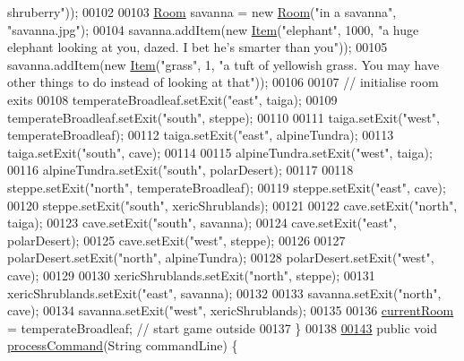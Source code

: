 \begin{DoxyCode}
{       shruberry"}));
00102 
00103         \hyperlink{classRoom}{Room} savanna = \textcolor{keyword}{new} \hyperlink{classRoom}{Room}(\textcolor{stringliteral}{"in a savanna"}, \textcolor{stringliteral}{"savanna.jpg"});
00104         savanna.addItem(\textcolor{keyword}{new} \hyperlink{classItem}{Item}(\textcolor{stringliteral}{"elephant"}, 1000, \textcolor{stringliteral}{"a huge elephant looking at you, dazed. I bet he's
       smarter than you"}));
00105         savanna.addItem(\textcolor{keyword}{new} \hyperlink{classItem}{Item}(\textcolor{stringliteral}{"grass"}, 1, \textcolor{stringliteral}{"a tuft of yellowish grass. You may have other things to
       do instead of looking at that"}));
00106 
00107         \textcolor{comment}{// initialise room exits}
00108         temperateBroadleaf.setExit(\textcolor{stringliteral}{"east"}, taiga);
00109         temperateBroadleaf.setExit(\textcolor{stringliteral}{"south"}, steppe);
00110 
00111         taiga.setExit(\textcolor{stringliteral}{"west"}, temperateBroadleaf);
00112         taiga.setExit(\textcolor{stringliteral}{"east"}, alpineTundra);
00113         taiga.setExit(\textcolor{stringliteral}{"south"}, cave);
00114 
00115         alpineTundra.setExit(\textcolor{stringliteral}{"west"}, taiga);
00116         alpineTundra.setExit(\textcolor{stringliteral}{"south"}, polarDesert);
00117 
00118         steppe.setExit(\textcolor{stringliteral}{"north"}, temperateBroadleaf);
00119         steppe.setExit(\textcolor{stringliteral}{"east"}, cave);
00120         steppe.setExit(\textcolor{stringliteral}{"south"}, xericShrublands);
00121 
00122         cave.setExit(\textcolor{stringliteral}{"north"}, taiga);
00123         cave.setExit(\textcolor{stringliteral}{"south"}, savanna);
00124         cave.setExit(\textcolor{stringliteral}{"east"}, polarDesert);
00125         cave.setExit(\textcolor{stringliteral}{"west"}, steppe);
00126 
00127         polarDesert.setExit(\textcolor{stringliteral}{"north"}, alpineTundra);
00128         polarDesert.setExit(\textcolor{stringliteral}{"west"}, cave);
00129 
00130         xericShrublands.setExit(\textcolor{stringliteral}{"north"}, steppe);
00131         xericShrublands.setExit(\textcolor{stringliteral}{"east"}, savanna);
00132 
00133         savanna.setExit(\textcolor{stringliteral}{"north"}, cave);
00134         savanna.setExit(\textcolor{stringliteral}{"west"}, xericShrublands);
00135 
00136         \hyperlink{classGameEngine_aa08e7cbb458047a2f72ff594d2e230bc}{currentRoom} = temperateBroadleaf;  \textcolor{comment}{// start game outside}
00137     \}
00138 
\hypertarget{GameEngine_8java_source_l00143}{}\hyperlink{classGameEngine_ad7133885f313fa99bca3bb7cb8272f64}{00143}     \textcolor{keyword}{public} \textcolor{keywordtype}{void} \hyperlink{classGameEngine_ad7133885f313fa99bca3bb7cb8272f64}{processCommand}(String commandLine) \{

\end{DoxyCode}
